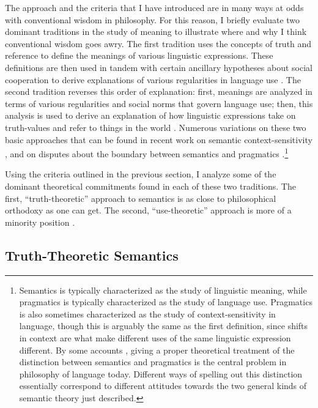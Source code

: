 The approach and the criteria that I have introduced are in many ways at odds with conventional wisdom in philosophy. For this reason, I briefly evaluate two dominant traditions in the study of meaning to illustrate where and why I think conventional wisdom goes awry. The first tradition uses the concepts of truth and reference to define the meanings of various linguistic expressions. These definitions are then used in tandem with certain ancillary hypotheses about social cooperation to derive explanations of various regularities in language use \citep[e.g.][]{Soames:2010,Lewis:1970,Lewis:1975,Davidson:1967,CappelenLepore:2005,Grice:1975}. The second tradition reverses this order of explanation: first, meanings are analyzed in terms of various regularities and social norms that govern language use; then, this analysis is used to derive an explanation of how linguistic expressions take on truth-values and refer to things in the world \citep[e.g.][]{Wittgenstein:1953,Brandom:1994,Brandom:2000,Horwich:2005,Sellars:1953}. Numerous variations on these two basic approaches that can be found in recent work on semantic context-sensitivity \citep{Recanati:2004,CappelenLepore:2005}, and on disputes about the boundary between semantics and pragmatics \citep{Brandom:2000,Recanati:2012}.\footnote{Semantics is typically characterized as the study of linguistic meaning, while pragmatics is typically characterized as the study of language use. Pragmatics is also sometimes characterized as the study of context-sensitivity in language, though this is arguably the same as the first definition, since shifts in context are what make different uses of the same linguistic expression different. By some accounts \citep[e.g.][]{CappelenLepore:2005}, giving a proper theoretical treatment of the distinction between semantics and pragmatics is the central problem in philosophy of language today. Different ways of spelling out this distinction essentially correspond to different attitudes towards the two general kinds of semantic theory just described.}

Using the criteria outlined in the previous section, I analyze some of the dominant theoretical commitments found in each of these two traditions. The first, ``truth-theoretic'' approach to semantics is as close to philosophical orthodoxy as one can get. The second, ``use-theoretic'' approach is more of a minority position \citep{Stanley:2008,Brandom:1994}.

\subsection{Truth-Theoretic Semantics}

